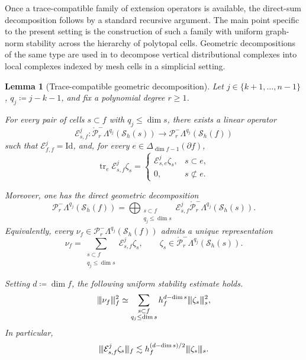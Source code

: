 \documentclass[a4paper,11pt]{article}
\newtheorem{lemma}[theorem]{Lemma}
\theoremstyle{definition}
\newcommand{\Sh}{\mathcal{S}_h}
\newcommand{\FM}[1]{\Delta_{#1}}
\newcommand{\PLtrim}[2]{\mathcal{P}_{#1}^{-}\Lambda^{#2}}
\newcommand{\trc}{\operatorname{tr}}
\newcommand{\PLtrimz}[2]{\mathring{\mathcal P}_{#1}^{-}\Lambda^{#2}}
\newcommand{\vvvert}{\vert\kern-0.25ex\vert\kern-0.25ex\vert}
\begin{document}
Once a trace-compatible family of extension operators is available, the direct-sum decomposition follows by a standard recursive argument.
The main point specific to the present setting is the construction of such a family with uniform graph-norm stability across the hierarchy of polytopal cells.
Geometric decompositions of the same type are used in \cite{Licht:17,Christiansen.Licht:20} to decompose vertical distributional complexes into local complexes indexed by mesh cells in a simplicial setting.

\begin{lemma}[Trace-compatible geometric decomposition]
\label{lem:geometric.extensions}
Let $j\in\{k+1,\ldots,n-1\}$, $q_j\coloneqq j-k-1$, and fix a polynomial degree $r\geq 1$.

For every pair of cells $s\subset f$ with $q_j\leq\dim s$, there exists a linear operator
\[
  \mathcal E_{s,f}^j\colon
  \PLtrimz{r}{q_j}(\Sh(s))
  \longrightarrow
  \PLtrim{r}{q_j}(\Sh(f))
\]
such that $\mathcal E_{f,f}^j=\mathrm{Id}$, and, for every $e\in\FM{\dim f-1}(\partial f)$,
\begin{equation}\label{eq:geometric.extension.trace}
  \trc_e
  \mathcal E_{s,f}^j\zeta_s
  =
  \begin{cases}
    \mathcal E_{s,e}^j\zeta_s,
    &s\subset e,
    \\[1mm]
    0,
    &s\not\subset e.
  \end{cases}
\end{equation}

Moreover, one has the direct geometric decomposition
\begin{equation}\label{eq:geometric.direct.sum}
\PLtrim{r}{q_j}(\Sh(f))
=\bigoplus_{\substack{
s\subset f\\
q_j\leq\dim s
}}
\mathcal E_{s,f}^j
\PLtrimz{r}{q_j}(\Sh(s)).
\end{equation}
Equivalently, every $\nu_f\in\PLtrim{r}{q_j}(\Sh(f))$ admits a unique representation
\[
  \nu_f
  =
  \sum_{\substack{
    s\subset f\\
    q_j\leq\dim s
  }}
  \mathcal E_{s,f}^j\zeta_s,
  \qquad
  \zeta_s\in
  \PLtrimz{r}{q_j}(\Sh(s)).
\]

Setting $d\coloneqq\dim f$, the following uniform stability estimate holds.
\begin{equation}\label{eq:geometric.norm.equivalence}
  \vvvert\nu_f\vvvert_f^2
  \simeq
  \sum_{\substack{
    s\subset f\\
    q_j\leq\dim s
  }}
  h_f^{d-\dim s}
  \vvvert\zeta_s\vvvert_s^2,
\end{equation}
In particular,
\begin{equation}\label{eq:geometric.extension.stability}
  \vvvert
  \mathcal E_{s,f}^j\zeta_s
  \vvvert_f
  \lesssim
  h_f^{(d-\dim s)/2}
  \vvvert\zeta_s\vvvert_s.
\end{equation}
\end{lemma}
\end{document}
